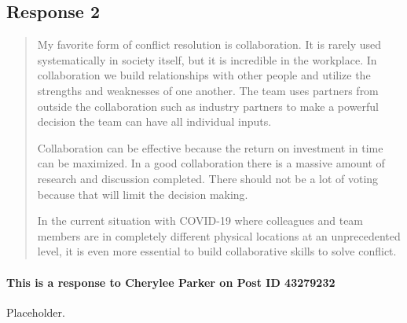 
\subsection{Response 2}
  \begin{quotation}
    My favorite form of conflict resolution is collaboration. It is rarely used
      systematically in society itself, but it is incredible in the workplace.
      In collaboration we build relationships with other people and utilize
      the strengths and weaknesses of one another. The team uses partners from
      outside the collaboration such as industry partners to make a powerful
      decision the team can have all individual inputs.

    Collaboration can be effective because the return on investment in time can
      be maximized. In a good collaboration there is a massive amount of
      research and discussion completed. There should not be a lot of voting
      because that will limit the decision making.

    In the current situation with COVID-19 where colleagues and team members
      are in completely different physical locations at an unprecedented level,
      it is even more essential to build collaborative skills to solve conflict.
  \end{quotation}

  \paragraph{This is a response to Cherylee Parker on Post ID 43279232}
    Placeholder.
